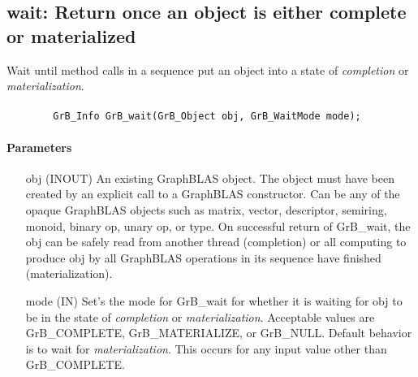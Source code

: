 \subsection{{\sf wait}: Return once an object is either complete or materialized}
\label{Sec:GrB_wait}

Wait until method calls in a sequence put an object 
into a state of \emph{completion} or \emph{materialization}.

\paragraph{\syntax}

\begin{verbatim}
        GrB_Info GrB_wait(GrB_Object obj, GrB_WaitMode mode);
\end{verbatim}

\paragraph{Parameters}

\begin{itemize}[leftmargin=1.1in]
        \item[{\sf obj}] ({\sf INOUT}) An existing GraphBLAS object.
        The object must have been created by an explicit call to a
        GraphBLAS constructor.  Can be any of the opaque GraphBLAS
        objects such as matrix, vector, descriptor, semiring, monoid,
        binary op, unary op, or type. On successful return of {\sf
        GrB\_wait}, the {\sf obj} can be safely read from another thread (completion)
        or all computing to produce {\sf obj} by all GraphBLAS operations 
        in its sequence have finished (materialization).   
        
        \item[{\sf mode}] ({\sf IN}) Set's the mode for {\sf GrB\_wait} for whether it is waiting 
        for {\sf obj} to be in the state of \emph{completion} or \emph{materialization}.  Acceptable 
        values are {\sf GrB\_COMPLETE}, {\sf GrB\_MATERIALIZE}, or {\sf GrB\_NULL}.
        Default behavior is to wait for \emph{materialization}.  This occurs for any input
        value other than {\sf GrB\_COMPLETE}.  
\end{itemize}

